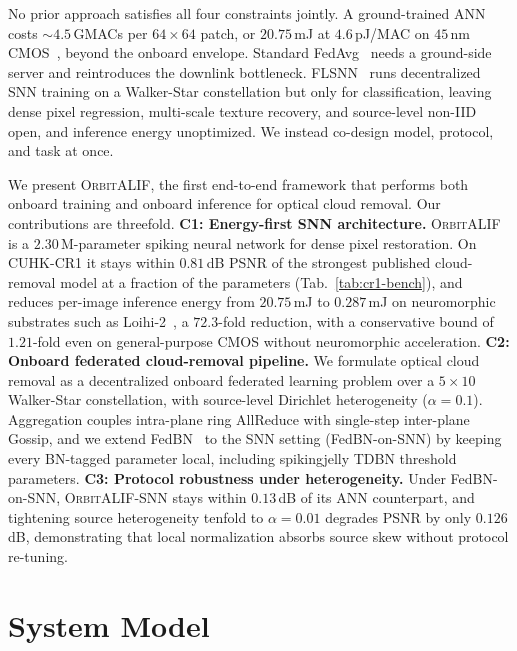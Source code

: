\documentclass[conference]{IEEEtran}
\newcommand{\OrbitALIF}{\textsc{OrbitALIF}}
\begin{document}
No prior approach satisfies all four constraints jointly. A
ground-trained ANN~\cite{ref:cuhkcr} costs $\sim\!4.5$\,GMACs per
$64\!\times\!64$ patch, or $20.75$\,mJ at $4.6$\,pJ/MAC on $45$\,nm
CMOS~\cite{ref:horowitz2014}, beyond the onboard envelope. Standard
FedAvg~\cite{ref:fedavg} needs a ground-side server and reintroduces
the downlink bottleneck. FLSNN~\cite{ref:flsnn} runs decentralized
SNN training on a Walker-Star constellation but only for
classification, leaving dense pixel regression, multi-scale texture
recovery, and source-level non-IID open, and inference energy
unoptimized. We instead co-design model, protocol, and task at once.

We present \OrbitALIF{}, the first end-to-end framework that
performs both onboard training and onboard inference for optical
cloud removal. Our contributions are threefold.
\textbf{C1: Energy-first SNN architecture.} \OrbitALIF{} is a
$2.30$\,M-parameter spiking neural network for dense pixel
restoration. On CUHK-CR1 it stays within $0.81$\,dB PSNR of the
strongest published cloud-removal model at a fraction of the
parameters (Tab.~\ref{tab:cr1-bench}), and reduces per-image
inference energy from $20.75$\,mJ to $0.287$\,mJ on neuromorphic
substrates such as Loihi-2~\cite{ref:loihi}, a $72.3$-fold
reduction, with a conservative bound of $1.21$-fold even on
general-purpose CMOS without neuromorphic acceleration.
\textbf{C2: Onboard federated cloud-removal pipeline.} We formulate
optical cloud removal as a decentralized onboard federated learning
problem over a $5\!\times\!10$ Walker-Star constellation, with
source-level Dirichlet heterogeneity ($\alpha\!=\!0.1$). Aggregation
couples intra-plane ring AllReduce with single-step inter-plane
Gossip, and we extend FedBN~\cite{ref:fedbn} to the SNN setting
(FedBN-on-SNN)
by keeping every BN-tagged parameter local, including spikingjelly
TDBN threshold parameters.
\textbf{C3: Protocol robustness under heterogeneity.} Under
FedBN-on-SNN, \OrbitALIF{}-SNN stays within $0.13$\,dB of its ANN
counterpart, and tightening source heterogeneity tenfold to
$\alpha\!=\!0.01$ degrades PSNR by only $0.126$\,dB, demonstrating
that local normalization absorbs source skew without protocol
re-tuning.

\section{System Model}\label{sec:sysmodel}
\end{document}
